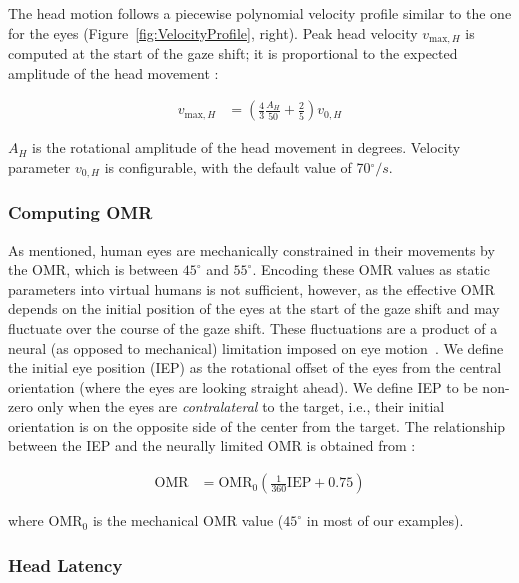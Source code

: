The head motion follows a piecewise polynomial velocity profile similar to the one for the eyes (Figure~\ref{fig:VelocityProfile}, right). Peak head velocity $v_{\mathrm{max},H}$ is computed at the start of the gaze shift; it is proportional to the expected amplitude of the head movement \citep{guitton1987gaze}:

\begin{align} \label{eq:AndristVmaxH}
v_{\mathrm{max},H} &= (\frac{4}{3} \frac{A_H}{50} + \frac{2}{5}) v_{0,H}
\end{align}

$A_H$ is the rotational amplitude of the head movement in degrees. Velocity parameter $v_{0,H}$ is configurable, with the default value of 70$^{\circ}/s$.

\subsubsection{Computing OMR}

As mentioned, human eyes are mechanically constrained in their movements by the OMR, which is between $45^{\circ}$ and $55^{\circ}$. Encoding these OMR values as static parameters into virtual humans is not sufficient, however, as the effective OMR depends on the initial position of the eyes at the start of the gaze shift and may fluctuate over the course of the gaze shift. These fluctuations are a product of a neural (as opposed to mechanical) limitation imposed on eye motion~\citep{guitton1987gaze}. We define the initial eye position (IEP) as the rotational offset of the eyes from the central orientation (where the eyes are looking straight ahead). We define IEP to be non-zero only when the eyes are \emph{contralateral} to the target, i.e., their initial orientation is on the opposite side of the center from the target. The relationship between the IEP and the neurally limited OMR is obtained from \citet{guitton1987gaze}:

\begin{align} \label{eq:AndristOMRIEP}
\mathrm{OMR} &= \mathrm{OMR}_0 (\frac{1}{360} \mathrm{IEP} + 0.75)
\end{align}

where $\mathrm{OMR}_0$ is the mechanical OMR value ($45^{\circ}$ in most of our examples).

\subsubsection{Head Latency}

